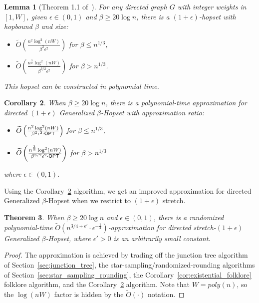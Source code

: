 \documentclass{article}
\newtheorem{theorem}{Theorem}[section]
\newtheorem{corollary}[theorem]{Corollary}
\newtheorem{lemma}[theorem]{Lemma}
\theoremstyle{definition}
\theoremstyle{remark}
\def\opt {{\sf OPT}}
\def\hopset {{\sc Generalized $\beta$-Hopset}}
\begin{document}
\begin{lemma}[Theorem 1.1 of~\cite{BW23}]
    For any directed graph $G$ with integer weights in $[1,W]$, given $\epsilon \in (0,1)$ and $\beta \geq  20\log n$, there is a $(1+\epsilon)$-hopset with hopbound $\beta$ and size:
    \begin{itemize}
        \item $\widetilde{O}\left(\frac{n^2\log^2(nW)}{\beta^3 \epsilon^2  }\right)$ for $\beta \leq n^{1/3}$,
        \item $\widetilde{O}\left(\frac{n^{\frac{3}{2}} \log^2(nW)}{\beta^{3/2} \epsilon^2}\right)$ for $\beta >n^{1/3}$.
    \end{itemize} 
    This hopset can be constructed in polynomial time.
\end{lemma}
\begin{corollary} \label{cor:existential_W}
    When $\beta \geq 20\log n$, there is a polynomial-time approximation for directed $(1+\epsilon)$ {\hopset} with approximation ratio:
        \begin{itemize}
        \item $\widetilde{O}\left(\frac{n^2\log^2(nW)}{\beta^3 \epsilon^2 \cdot \opt  }\right)$ for $\beta \leq n^{1/3}$,
        \item $\widetilde{O}\left(\frac{n^{\frac{3}{2}} \log^2(nW)}{\beta^{3/2} \epsilon^2 \cdot \opt}\right)$ for $\beta >n^{1/3}$
    \end{itemize}
    where $\epsilon \in (0,1)$.
\end{corollary}

Using the Corollary~\ref{cor:existential_W} algorithm, we get an improved approximation for directed {\hopset} when we restrict to $(1+\epsilon)$ stretch. 

\begin{theorem} \label{thm:dir_eps}
    When $\beta \geq 20\log n$ and $\epsilon \in (0,1)$, there is a randomized polynomial-time $\widetilde{O}(n^{3/4 + \epsilon'} \cdot \epsilon^{-\frac{1}{4}})$-approximation for directed stretch-$(1+\epsilon)$ {\hopset}, where $\epsilon' > 0$ is an arbitrarily small constant.
\end{theorem}
\begin{proof}
    The approximation is achieved by trading off the junction tree algorithm of Section~\ref{sec:junction_tree}, the star-sampling/randomized-rounding algorithms of Section~\ref{sec:star_sampling_rounding}, the Corollary~\ref{cor:existential_folklore} folklore algorithm, and the Corollary~\ref{cor:existential_W} algorithm. Note that $W = poly(n)$, so the $\log(nW)$ factor is hidden by the $\widetilde{O}(\cdot)$ notation.
\end{proof}
\end{document}
